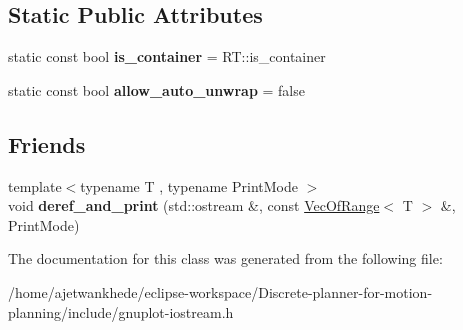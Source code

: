 \subsection*{Static Public Attributes}
\begin{DoxyCompactItemize}
\item 
\mbox{\label{classgnuplotio_1_1VecOfRange_a8725d4907d46575dddb7152f1f1d1f66}} 
static const bool {\bfseries is\+\_\+container} = R\+T\+::is\+\_\+container
\item 
\mbox{\label{classgnuplotio_1_1VecOfRange_a19d87e61a7854f9e22d3dd8a94f79500}} 
static const bool {\bfseries allow\+\_\+auto\+\_\+unwrap} = false
\end{DoxyCompactItemize}
\subsection*{Friends}
\begin{DoxyCompactItemize}
\item 
\mbox{\label{classgnuplotio_1_1VecOfRange_adafbfb0122b8e499d1af9c246f4ac288}} 
{\footnotesize template$<$typename T , typename Print\+Mode $>$ }\\void {\bfseries deref\+\_\+and\+\_\+print} (std\+::ostream \&, const \mbox{\hyperlink{classgnuplotio_1_1VecOfRange}{Vec\+Of\+Range}}$<$ T $>$ \&, Print\+Mode)
\end{DoxyCompactItemize}


The documentation for this class was generated from the following file\+:\begin{DoxyCompactItemize}
\item 
/home/ajetwankhede/eclipse-\/workspace/\+Discrete-\/planner-\/for-\/motion-\/planning/include/gnuplot-\/iostream.\+h\end{DoxyCompactItemize}
